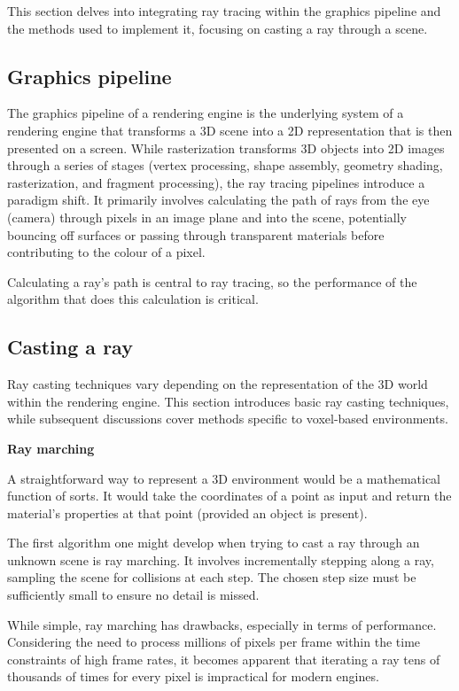 This section delves into integrating ray tracing within the graphics pipeline and the methods used to implement it, focusing on casting a ray through a scene.

\subsection{Graphics pipeline}
The graphics pipeline of a rendering engine is the underlying system of a rendering engine that transforms a 3D scene into a 2D representation that is then presented on a screen. While rasterization transforms 3D objects into 2D images through a series of stages (vertex processing, shape assembly, geometry shading, rasterization, and fragment processing), the ray tracing pipelines introduce a paradigm shift. It primarily involves calculating the path of rays from the eye (camera) through pixels in an image plane and into the scene, potentially bouncing off surfaces or passing through transparent materials before contributing to the colour of a pixel.

Calculating a ray's path is central to ray tracing, so the performance of the algorithm that does this calculation is critical.
\subsection{Casting a ray}
Ray casting techniques vary depending on the representation of the 3D world within the rendering engine.
This section introduces basic ray casting techniques, while subsequent discussions cover methods specific to voxel-based environments.

\newpage
\textbf{Ray marching}

A straightforward way to represent a 3D environment would be a mathematical function of sorts.
It would take the coordinates of a point as input and return the material's properties at that point (provided an object is present).

The first algorithm one might develop when trying to cast a ray through an unknown scene is ray marching.
It involves incrementally stepping along a ray, sampling the scene for collisions at each step.
The chosen step size must be sufficiently small to ensure no detail is missed.

While simple, ray marching has drawbacks, especially in terms of performance.
Considering the need to process millions of pixels per frame within the time constraints of high frame rates, it becomes apparent that iterating a ray tens of thousands of times for every pixel is impractical for modern engines.

